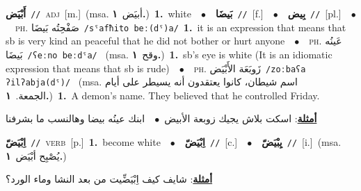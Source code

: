 \documentclass[10pt,a4paper,twoside]{article} %
\begin{document}
\begin{multicols}{2}
{\setlength\topsep{0pt}\textbf{\foreignlanguage{arabic}{أَبْيَض}}\ {\color{gray}\texttt{//}\color{black}}\ \textsc{adj}\ [m.]\ \color{gray}(msa. \foreignlanguage{arabic}{أبيَض}~\foreignlanguage{arabic}{\textbf{١.}})\color{black}\ \textbf{1.}~white\ \ $\bullet$\ \ \setlength\topsep{0pt}\textbf{\foreignlanguage{arabic}{بَيضَا}}\ {\color{gray}\texttt{//}\color{black}}\ [f.]\ \ $\bullet$\ \ \setlength\topsep{0pt}\textbf{\foreignlanguage{arabic}{بِيض}}\ {\color{gray}\texttt{//}\color{black}}\ [pl.]\ \ $\bullet$\ \ \textsc{ph.} \color{gray} \foreignlanguage{arabic}{صَفْحِتُه بَيضَا}\color{black}\ {\color{gray}\texttt{/{\sffamily sˤafħito beː(dˤ)a}/}\color{black}}\ \textbf{1.}~it is an expression that means that sb is very kind an peaceful that he did not bother or hurt anyone\ \ $\bullet$\ \ \textsc{ph.} \color{gray} \foreignlanguage{arabic}{عَينُه بَيضَا}\color{black}\ {\color{gray}\texttt{/{\sffamily ʕeːno beːdˤa}/}\color{black}}\ \color{gray} (msa. \foreignlanguage{arabic}{وقح}~\foreignlanguage{arabic}{\textbf{١.}})\color{black}\ \textbf{1.}~sb's eye is white (It is an idiomatic expression that means that sb is rude)\ \ $\bullet$\ \ \textsc{ph.} \color{gray} \foreignlanguage{arabic}{زَوبَعَة الأَبْيَض}\color{black}\ {\color{gray}\texttt{/{\sffamily zoːbaʕa ʔilʔabja(dˤ)}/}\color{black}}\ \color{gray} (msa. \foreignlanguage{arabic}{اسم شيطان، كانوا يعتقدون أنه يسيطر على أيام الجمعة.}~\foreignlanguage{arabic}{\textbf{١.}})\color{black}\ \textbf{1.}~A demon's name. They believed that he controlled Friday.\  \begin{flushright}\color{gray}\foreignlanguage{arabic}{\textbf{\underline{\foreignlanguage{arabic}{أمثلة}}}: اسكت بلاش يجيك زوبعة الأبيض\ $\bullet$\ \  ابنك عينُه بيضا وهالنسب ما بشرفنا}\end{flushright}\color{black}} \vspace{2mm}

{\setlength\topsep{0pt}\textbf{\foreignlanguage{arabic}{اِبْيَضّ}}\ {\color{gray}\texttt{//}\color{black}}\ \textsc{verb}\ [p.]\ \textbf{1.}~become white\ \ $\bullet$\ \ \setlength\topsep{0pt}\textbf{\foreignlanguage{arabic}{اِبْيَضّ}}\ {\color{gray}\texttt{//}\color{black}}\ [c.]\ \ $\bullet$\ \ \setlength\topsep{0pt}\textbf{\foreignlanguage{arabic}{يِبْيَضّ}}\ {\color{gray}\texttt{//}\color{black}}\ [i.]\ \color{gray}(msa. \foreignlanguage{arabic}{يُصْبِح أبْيَض}~\foreignlanguage{arabic}{\textbf{١.}})\color{black}\  \begin{flushright}\color{gray}\foreignlanguage{arabic}{\textbf{\underline{\foreignlanguage{arabic}{أمثلة}}}: شايف كيف اِبْيَضِّيت من بعد النشا وماء الورد؟}\end{flushright}\color{black}} \vspace{2mm}


\end{multicols}
\end{document}
